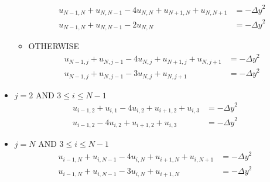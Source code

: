 \documentclass[10pt]{article}
\begin{document}
\begin{itemize}
\begin{itemize}
			\begin{align*}
				u_{N-1,N} + u_{N,N-1} - 4u_{N,N} + u_{N+1,N} + u_{N,N+1} &= -{\Delta y}^2\\
				u_{N-1,N} + u_{N,N-1} - 2u_{N,N} &= -{\Delta y}^2
			\end{align*}
			\item OTHERWISE
			\begin{align*}
				u_{N-1,j} + u_{N,j-1} - 4u_{N,j} + u_{N+1,j} + u_{N,j+1} &= -{\Delta y}^2\\
				u_{N-1,j} + u_{N,j-1} - 3u_{N,j} + u_{N,j+1} &= -{\Delta y}^2
			\end{align*}
		\end{itemize}
		\item $ j = 2 $ AND $ 3\leq i\leq N-1 $
		\begin{align*}
			u_{i-1,2} + u_{i,1} - 4u_{i,2} + u_{i+1,2} + u_{i,3} &= -{\Delta y}^2\\
			u_{i-1,2} - 4u_{i,2} + u_{i+1,2} + u_{i,3} &= -{\Delta y}^2
		\end{align*}
		\item $ j = N $ AND $ 3\leq i\leq N-1 $
		\begin{align*}
			u_{i-1,N} + u_{i,N-1} - 4u_{i,N} + u_{i+1,N} + u_{i,N+1} &= -{\Delta y}^2\\
			u_{i-1,N} + u_{i,N-1} - 3u_{i,N} + u_{i+1,N} &= -{\Delta y}^2
		\end{align*}
	\end{itemize}
\end{document}
